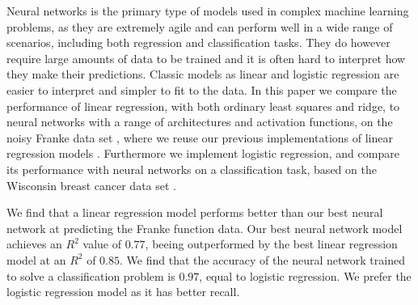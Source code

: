 Neural networks is the primary type of models used in complex machine learning problems, as they are extremely agile and can perform well in a wide range of scenarios, including both regression and classification tasks.
They do however require large amounts of data to be trained and it is often hard to interpret how they make their predictions.
Classic models as linear and logistic regression are easier to interpret and simpler to fit to the data.
In this paper we compare the performance of linear regression, with both ordinary least squares and ridge, to neural networks with a range of architectures and activation functions, on the noisy Franke data set \cite{frank}, where we reuse our previous implementations of linear regression models \cite{project1}.
Furthermore we implement logistic regression, and compare its performance with neural networks on a classification task, based on the Wisconsin breast cancer data set \cite{breast_cancer_wisconsin}.

We find that a linear regression model performs better than our best neural network at predicting the Franke function data. 
Our best neural network model achieves an $R^2$ value of $0.77$, beeing outperformed by the best linear regression model at an $R^2$ of $0.85$.
We find that the accuracy of the neural network trained to solve a classification problem is $0.97$, equal to logistic regression. We prefer the logistic regression model as it has better recall.


